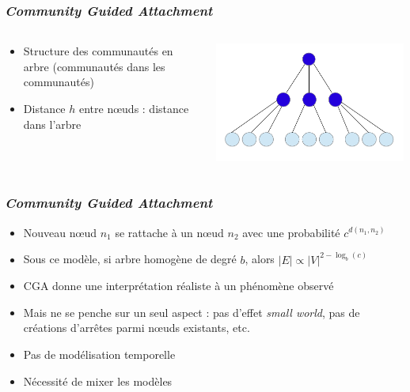 \documentclass[c]{beamer}
\begin{document}
\begin{frame}
    \frametitle{\emph{Community Guided Attachment}}

    \begin{columns}
        \begin{column}{.5\textwidth}
            \begin{itemize}
                \item Structure des communautés en arbre (communautés dans les
                    communautés)
                \item Distance $h$ entre n\oe{}uds : distance dans l'arbre
            \end{itemize}
        \end{column}
        \begin{column}{.5\textwidth}
            \includegraphics[width=.7\textwidth]{./figures/tree.png}
        \end{column}
    \end{columns}
\end{frame}

\begin{frame}
    \frametitle{\emph{Community Guided Attachment}}
    \begin{itemize}
        \item Nouveau n\oe{}ud $n_1$ se rattache à un n\oe{}ud $n_2$
            avec une probabilité $c^{d(n_1, n_2)}$
        \item Sous ce modèle, si arbre homogène de degré $b$, alors $|E|
            \propto |V|^{2 - \log_b(c)}$
    \end{itemize}
\end{frame}

\begin{frame}
    \begin{itemize}
        \item CGA donne une interprétation réaliste à un phénomène observé
        \item Mais ne se penche sur un seul aspect : pas d'effet \emph{small
            world}, pas de créations d'arrêtes parmi n\oe{}uds existants, etc.
        \item Pas de modélisation temporelle
        \item Nécessité de mixer les modèles
    \end{itemize}
\end{frame}
\end{document}
